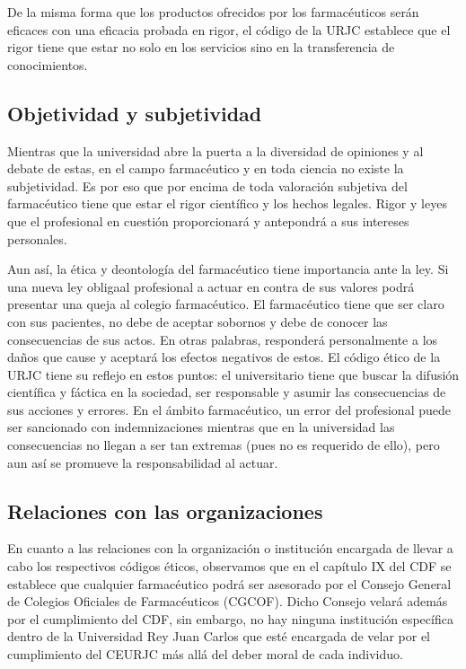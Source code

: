 \documentclass[11pt,a4paper]{article}
\begin{document}
De la misma forma que los productos ofrecidos por los farmacéuticos serán eficaces con una eficacia probada en rigor, el código de la URJC establece que el rigor tiene que estar no solo en los servicios sino en la transferencia de conocimientos.

\subsection{Objetividad y subjetividad}
Mientras que la universidad abre la puerta a la diversidad de opiniones y al debate de estas, en el campo farmacéutico y en toda ciencia no existe la subjetividad. Es por eso que por encima de toda valoración subjetiva del farmacéutico tiene que estar el rigor científico y los hechos legales. Rigor y leyes que el profesional en cuestión proporcionará y antepondrá a sus intereses personales. 

Aun así, la ética y deontología del farmacéutico tiene importancia ante la ley. Si una nueva ley obligaal profesional a actuar en contra de sus valores podrá presentar una queja al colegio farmacéutico. El farmacéutico tiene que ser claro con sus pacientes, no debe de aceptar sobornos y debe de conocer las consecuencias de sus actos. En otras palabras, responderá personalmente a los daños que cause y aceptará los efectos negativos de estos. El código ético de la URJC tiene su reflejo en estos puntos: el universitario tiene que buscar la difusión científica y fáctica en la sociedad, ser responsable y asumir las consecuencias de sus acciones y errores. En el ámbito farmacéutico, un error del profesional puede ser sancionado con indemnizaciones mientras que en la universidad las consecuencias no llegan a ser tan extremas (pues no es requerido de ello), pero aun así se promueve la responsabilidad al actuar.

\subsection{Relaciones con las organizaciones}
 En cuanto a las relaciones con la organización o institución encargada de llevar a cabo los respectivos códigos éticos, observamos que en el capítulo IX del CDF se establece que cualquier farmacéutico podrá ser asesorado por el Consejo General de Colegios Oficiales de Farmacéuticos (CGCOF). Dicho Consejo velará además por el cumplimiento del CDF, %
 sin embargo, no hay ninguna institución específica dentro de la Universidad Rey Juan Carlos que esté encargada de velar por el cumplimiento del CEURJC más allá del deber moral de cada individuo.
\end{document}
